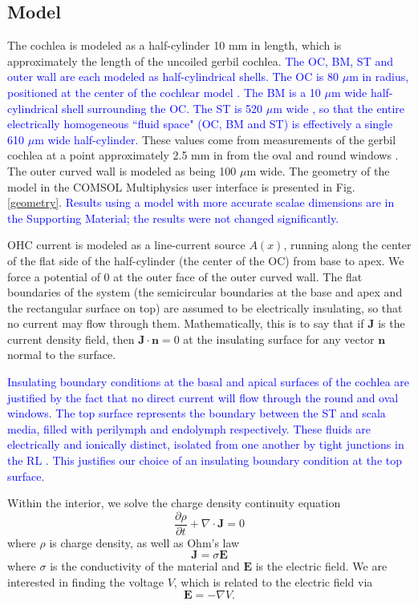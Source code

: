 \documentclass{biophys-new}
\begin{document}
\subsection{Model}
\par{The cochlea is modeled as a half-cylinder 10 mm in length, which is approximately the length of the uncoiled gerbil cochlea. \textcolor{blue}{The OC, BM, ST and outer wall are each modeled as half-cylindrical shells. The OC is 80 $\mu$m in radius, positioned at the center of the cochlear model \cite{edge}. The BM is a 10 $\mu$m wide half-cylindrical shell surrounding the OC. The ST is 520 $\mu$m wide \cite{plassmann}, so that the entire electrically homogeneous ``fluid space" (OC, BM and ST) is effectively a single 610 $\mu$m wide half-cylinder.} These values come from measurements of the gerbil cochlea at a point approximately 2.5 mm in from the oval and round windows \cite{plassmann}. The outer curved wall is modeled as being 100 $\mu$m wide. The geometry of the model in the COMSOL Multiphysics user interface is presented in Fig. \ref{geometry}. \textcolor{blue}{Results using a model with more accurate scalae dimensions are in the Supporting Material;  the results were not changed significantly.}}
\par{OHC current is modeled as a line-current source $A(x)$, running along the center of the flat side of the half-cylinder (the center of the OC) from base to apex. We force a potential of 0 at the outer face of the outer curved wall. The flat boundaries of the system (the semicircular boundaries at the base and apex and the rectangular surface on top) are assumed to be electrically insulating, so that no current may flow through them. Mathematically, this is to say that if $\mathbf{J}$ is the current density field, then $\mathbf{J}\cdot \mathbf{n} = 0$ at the insulating surface for any vector $\mathbf{n}$ normal to the surface.}
\par{\textcolor{blue}{Insulating boundary conditions at the basal and apical surfaces of the cochlea are justified by the fact that no direct current will flow through the round and oval windows. The top surface represents the boundary between the ST and scala media, filled with perilymph and endolymph respectively. These fluids are electrically and ionically distinct, isolated from one another by tight junctions in the RL \cite{gulley_reese_1976, Nin}. This justifies our choice of an insulating boundary condition at the top surface.}}
\par{Within the interior, we solve the charge density continuity equation
\begin{equation}\frac{\partial \rho}{\partial t} + \nabla \cdot \mathbf{J} = 0\label{cont}\end{equation}
where $\rho$ is charge density, as well as Ohm's law
\begin{equation}\mathbf{J} = \sigma\mathbf{E}\label{ohm}\end{equation}
where $\sigma$ is the conductivity of the material and $\mathbf{E}$ is the electric field. We are interested in finding the voltage $V$, which is related to the electric field via
\begin{equation}\mathbf{E} = -\nabla V.\label{pot}\end{equation}} 
\end{document}
